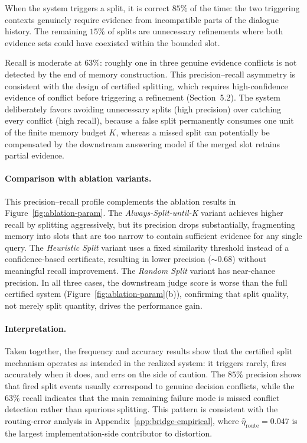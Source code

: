 \documentclass{article}
\theoremstyle{plain}
\theoremstyle{definition}
\theoremstyle{remark}
\begin{document}
\noindent
When the system triggers a split, it is correct $85\%$ of the time:
the two triggering contexts genuinely require evidence from
incompatible parts of the dialogue history. The remaining $15\%$ of
splits are unnecessary refinements where both evidence sets could have
coexisted within the bounded slot.

Recall is moderate at $63\%$: roughly one in three genuine evidence
conflicts is not detected by the end of memory construction. This
precision--recall asymmetry is consistent with the design of certified
splitting, which requires high-confidence evidence of conflict before
triggering a refinement (Section~5.2). The system deliberately favors
avoiding unnecessary splits (high precision) over catching every
conflict (high recall), because a false split permanently consumes one
unit of the finite memory budget $K$, whereas a missed split can
potentially be compensated by the downstream answering model if the
merged slot retains partial evidence.

\paragraph{Comparison with ablation variants.}
This precision--recall profile complements the ablation results in
Figure~\ref{fig:ablation-param}. The \emph{Always-Split-until-K} variant
achieves higher recall by splitting aggressively, but its precision
drops substantially, fragmenting memory into slots that are too narrow
to contain sufficient evidence for any single query. The
\emph{Heuristic Split} variant uses a fixed similarity threshold
instead of a confidence-based certificate, resulting in lower precision
(${\sim}0.68$) without meaningful recall improvement. The
\emph{Random Split} variant has near-chance precision. In all three
cases, the downstream judge score is worse than the full certified
system (Figure~\ref{fig:ablation-param}(b)), confirming that split quality,
not merely split quantity, drives the performance gain.

\paragraph{Interpretation.}
Taken together, the frequency and accuracy results show that the
certified split mechanism operates as intended in the realized system:
it triggers rarely, fires accurately when it does, and errs on the
side of caution. The \(85\%\) precision shows that fired split events
usually correspond to genuine decision conflicts, while the \(63\%\)
recall indicates that the main remaining failure mode is missed conflict
detection rather than spurious splitting. This pattern is consistent with
the routing-error analysis in Appendix~\ref{app:bridge-empirical}, where
\(\hat{\eta}_{\mathrm{route}} = 0.047\) is the largest implementation-side
contributor to distortion.
\end{document}
